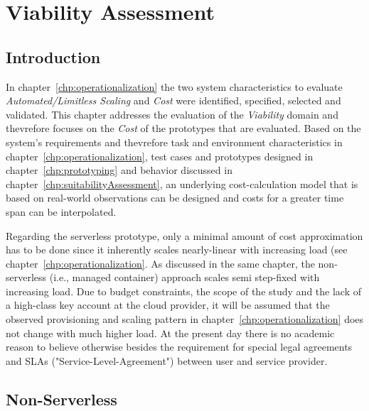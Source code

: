 \chapter{Viability Assessment}\label{chp:viabilityAssessment}


\section{Introduction}

In chapter~\vref{chp:operationalization} the two system characteristics to evaluate \textit{Automated/Limitless Scaling} and \textit{Cost} were identified, specified, selected and validated. This chapter addresses the evaluation of the \textit{Viability} domain and thevrefore focuses on the \textit{Cost} of the prototypes that are evaluated. Based on the system's requirements and thevrefore task and environment characteristics in chapter~\vref{chp:operationalization}, test cases and prototypes designed in chapter~\vref{chp:prototyping} and behavior discussed in chapter~\vref{chp:suitabilityAssessment}, an underlying cost-calculation model that is based on real-world observations can be designed and costs for a greater time span can be interpolated.

Regarding the serverless prototype, only a minimal amount of cost approximation has to be done since it inherently scales nearly-linear with increasing load (see chapter~\vref{chp:operationalization}. As discussed in the same chapter, the non-serverless (i.e., managed container) approach scales semi step-fixed with increasing load. Due to budget constraints, the scope of the study and the lack of a high-class key account at the cloud provider, it will be assumed that the observed provisioning and scaling pattern in chapter~\vref{chp:operationalization} does not change with much higher load. At the present day there is no academic reason to believe otherwise besides the requirement for special legal agreements and SLAs ("Service-Level-Agreement") between user and service provider. 

\section{Non-Serverless}\label{chp:viaNSL}

